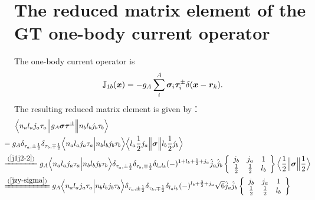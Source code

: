 \documentclass[master]{shnuthesis}
\newcommand{\bmr}{\textbf{\textit{r}}}
\newcommand{\il}{\!\!\!\!\!\!\!\!\!\!}
\newcommand{\zdydh}{\xlongequal}
\begin{document}
\section{The reduced matrix element of the GT one-body current operator}
The one-body current operator is
\begin{align}
    \mathbb{J}_{1 b}(\boldsymbol{x}) = -g_A\sum_{i}^{A} \bm{\sigma}_i \bm{\tau}_i^{\pm} \delta(\bm{x} - \bmr_k).
\end{align}
The resulting reduced matrix element is given by：
\begin{align}
    & \Big\langle n_a l_a j_a \tau_a \Big\| g_A \bm{\sigma} \bm{\tau}^{\pm} \Big\| n_b l_b j_b \tau_b \Big\rangle \\
    &\il = g_A \delta_{\tau_{a},\pm\frac{1}{2}}\delta_{\tau_{b},\mp\frac{1}{2}} \Big\langle n_a l_a j_a \tau_a \Big| n_b l_b j_b \tau_b \Big\rangle \Big\langle l_a \frac{1}{2} j_a \Big\| \bm{\sigma} \Big\| l_b \frac{1}{2} j_b \Big\rangle \\
    &\il \zdydh{(\ref{j1j2-2})} g_A \Big\langle n_a l_a j_a \tau_a \Big| n_b l_b j_b \tau_b \Big\rangle \delta_{\tau_{a},\pm\frac{1}{2}}\delta_{\tau_{b},\mp\frac{1}{2}} \delta_{l_a l_b} (-)^{1+l_b+\frac{1}{2}+j_a} \hat{j}_a \hat{j}_b  \left\{\begin{array}{ccc} j_b & j_a & 1 \\ \frac{1}{2} & \frac{1}{2} & l_b \end{array}\right\}  \Big\langle \frac{1}{2} \Big\| \bm{\sigma} \Big\| \frac{1}{2} \Big\rangle \\
    &\il \zdydh{(\ref{jzy-sigma})} g_A \Big\langle n_a l_a j_a \tau_a \Big| n_b l_b j_b \tau_b \Big\rangle \delta_{\tau_{a},\pm\frac{1}{2}}\delta_{\tau_{b},\mp\frac{1}{2}} \delta_{l_a l_b} (-)^{l_b+\frac{3}{2}+j_a} \sqrt{6}\hat{j}_a \hat{j}_b  \left\{\begin{array}{ccc} j_b & j_a & 1 \\ \frac{1}{2} & \frac{1}{2} & l_b \end{array}\right\}  
\end{align}
\end{document}
